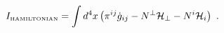 \begin{equation}
I_{\mbox{{\tiny HAMILTONIAN}}}=\int d^4 x \left( \pi^{ij}\dot{g}_{ij} - N^{\perp}{\cal H}_{\perp} - N^{i}{\cal
H}_{i} \right) \ .
\label{hamaction}
\end{equation}

